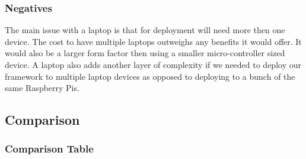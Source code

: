 \documentclass[draftclsnofoot, onecolumn, compsoc, 10pt]{IEEEtran}
\begin{document}
\subsubsection{Negatives}
The main issue with a laptop is that for deployment will need more then one device. The cost to have multiple laptops outweighs any benefits it would offer. It would also be a larger form factor then using a smaller micro-controller sized device. A laptop also adds another layer of complexity if we needed to deploy our framework to multiple laptop devices as opposed to deploying to a bunch of the same Raspberry Pis.

\subsection{Comparison}
\subsubsection{Comparison Table}
\FloatBarrier
\begin{table}[H]
\fontsize{3}{4}\selectfont
\centering
\def\arraystretch{1.2}
\newline\newline 
\end{table}
\end{document}
